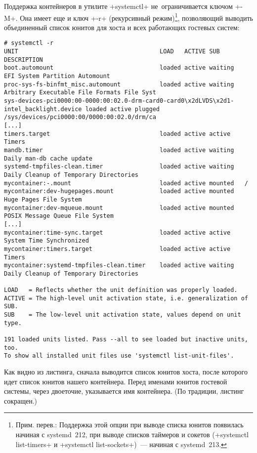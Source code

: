 \documentclass[10pt,oneside,a4paper]{article}
\begin{document}
Поддержка контейнеров в утилите +systemctl+ не~ограничивается ключом +-M+.
Она имеет еще и ключ +-r+ (рекурсивный режим)\footnote{Прим. перев.:
Поддержка этой опции при выводе списка юнитов появилась начиная с systemd~212,
при выводе списков таймеров и сокетов (+systemctl list-timers+ и 
+systemctl list-sockets+)~--- начиная с systemd~213.}, позволяющий выводить
объединенный список юнитов для хоста и всех работающих гостевых систем:
\begin{Verbatim}[fontsize=\small]
# systemctl -r
UNIT                                        LOAD   ACTIVE SUB       DESCRIPTION
boot.automount                              loaded active waiting   EFI System Partition Automount
proc-sys-fs-binfmt_misc.automount           loaded active waiting   Arbitrary Executable File Formats File Syst
sys-devices-pci0000:00-0000:00:02.0-drm-card0-card0\x2dLVDS\x2d1-intel_backlight.device loaded active plugged   /sys/devices/pci0000:00/0000:00:02.0/drm/ca
[...]
timers.target                               loaded active active    Timers
mandb.timer                                 loaded active waiting   Daily man-db cache update
systemd-tmpfiles-clean.timer                loaded active waiting   Daily Cleanup of Temporary Directories
mycontainer:-.mount                         loaded active mounted   /
mycontainer:dev-hugepages.mount             loaded active mounted   Huge Pages File System
mycontainer:dev-mqueue.mount                loaded active mounted   POSIX Message Queue File System
[...]
mycontainer:time-sync.target                loaded active active    System Time Synchronized
mycontainer:timers.target                   loaded active active    Timers
mycontainer:systemd-tmpfiles-clean.timer    loaded active waiting   Daily Cleanup of Temporary Directories

LOAD   = Reflects whether the unit definition was properly loaded.
ACTIVE = The high-level unit activation state, i.e. generalization of SUB.
SUB    = The low-level unit activation state, values depend on unit type.

191 loaded units listed. Pass --all to see loaded but inactive units, too.
To show all installed unit files use 'systemctl list-unit-files'.
\end{Verbatim}

Как видно из листинга, сначала выводится список юнитов хоста, после которого
идет список юнитов нашего контейнера. Перед именами юнитов гостевой системы,
через двоеточие, указывается имя контейнера. (По традиции, листинг сокращен.)
\end{document}
